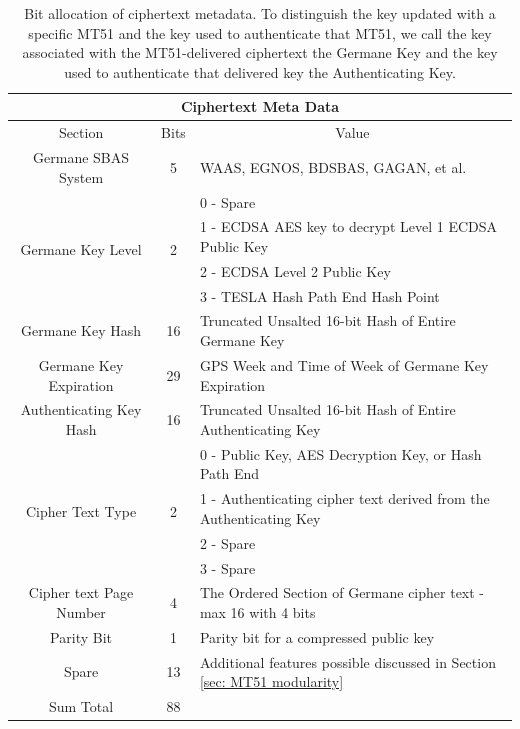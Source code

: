 \documentclass[letterpaper,times]{IONconf/IONconf}
\begin{document}
\begin{table}[H]
\center
\begin{tabular}{|c|c|l|} \hline
	\multicolumn{3}{|c|}{Ciphertext Meta Data} \\ \hline
	Section & Bits & \multicolumn{1}{|c|}{Value} \\ \hline
	Germane SBAS System & 5 & WAAS, EGNOS, BDSBAS, GAGAN, et al. \\ \hline
	\multirow{4}{*}{Germane Key Level} & \multirow{4}{*}{2} & 0 - Spare \\ 
	& & 1 - ECDSA AES key to decrypt Level 1 ECDSA Public Key \\
	& & 2 - ECDSA Level 2 Public Key \\
	& & 3 - TESLA Hash Path End Hash Point \\ \hline
	Germane Key Hash & 16 & Truncated Unsalted 16-bit Hash of Entire Germane Key \\ \hline
	Germane Key Expiration & 29 & GPS Week and Time of Week of Germane Key Expiration \\ \hline
	Authenticating Key Hash & 16 & Truncated Unsalted 16-bit Hash of Entire Authenticating Key \\ \hline
	\multirow{4}{*}{Cipher Text Type} & \multirow{4}{*}{2} & 0 - Public Key, AES Decryption Key, or Hash Path End \\
	& & 1 - Authenticating cipher text derived from the Authenticating Key \\ 
	& & 2 - Spare \\ 
	& & 3 - Spare \\ \hline
	Cipher text Page Number & 4 & The Ordered Section of Germane cipher text - max 16 with 4 bits\\ \hline
	Parity Bit & 1 & Parity bit for a compressed public key \\ \hline
	Spare & 13 & Additional features possible discussed in Section \ref{sec: MT51 modularity} \\ \hline
	Sum Total & 88 & \\ \hline
\end{tabular}
\caption{Bit allocation of ciphertext metadata. To distinguish the key updated with a specific MT51 and the key used to authenticate that MT51, we call the key associated with the MT51-delivered ciphertext the Germane Key and the key used to authenticate that delivered key the Authenticating Key.}
\label{tab: meta-data table}
\end{table}
\end{document}
